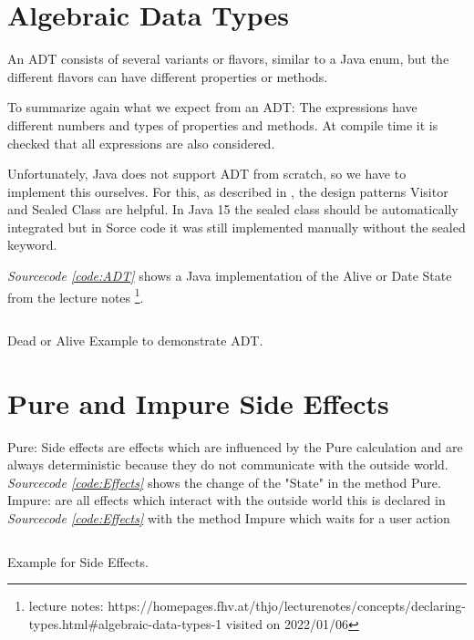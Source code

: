 \documentclass[a4paper,12pt,twoside]{scrreprt}
\begin{document}
\clearpage

\section{Algebraic Data Types}
An \ac{ADT} consists of several variants or flavors, similar to a Java enum, but the different flavors can have different properties or methods.

To summarize again what we expect from an \ac{ADT}:
The expressions have different numbers and types of properties and methods.
At compile time it is checked that all expressions are also considered.

Unfortunately, Java does not support ADT from scratch, so we have to implement this ourselves. For this, as described in \cite{MAINIERO_algebraic_2020}, the design patterns Visitor and Sealed Class are helpful. In Java 15 the sealed class should be automatically integrated but in Sorce code it was still implemented manually without the sealed keyword.

\emph{Sourcecode \ref{code:ADT}} shows a Java implementation of the Alive or Date State from the lecture notes \footnote{ lecture notes: https://homepages.fhv.at/thjo/lecturenotes/concepts/declaring-types.html\#algebraic-data-types-1 visited on 2022/01/06}.
\begin{listing}[ht]
    \inputminted[fontsize=\footnotesize,linenos]{java}{./code/ADT.java}
    \caption[Example for a \ac{ADT}]{Dead or Alive Example to demonstrate \ac{ADT}.}
    \label{code:ADT}
\end{listing}
\clearpage


\section{Pure and Impure Side Effects}
Pure: Side effects are effects which are influenced by the Pure calculation and are always deterministic because they do not communicate with the outside world. \emph{Sourcecode \ref{code:Effects}} shows the change of the "State" in the method Pure.
\newline
Impure: are all effects which interact with the outside world this is declared in \emph{Sourcecode \ref{code:Effects}} with the method Impure which waits for a user action
\begin{listing}[ht]
    \inputminted[fontsize=\footnotesize,linenos]{java}{./code/SideEffects.java}
    \caption[Example for Side Effects]{Example for Side Effects.}
    \label{code:Effects}
\end{listing}
\clearpage
\end{document}
